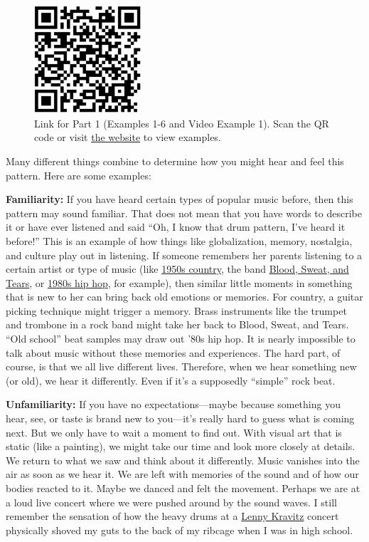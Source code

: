 \documentclass[twoside]{article}
\providecommand{\wmturlcaption}{
  Scan the QR code or visit \href{https://worldmusictextbook.org/witulski-2021}{the website} to view examples.
}
\begin{document}
\begin{figure}
  \centering
  \includegraphics[height=4cm]{witulski-rhythm-part-1.png}
  \caption*{Link for Part 1 (Examples 1-6 and Video Example 1). \wmturlcaption}
\end{figure}

Many different things combine to determine how you might hear and feel
this pattern. Here are some examples:

\textbf{Familiarity:} If you have heard certain types of popular music
before, then this pattern may sound familiar. That does not mean that
you have words to describe it or have ever listened and said ``Oh, I
know that drum pattern, I've heard it before!'' This is an example of
how things like globalization, memory, nostalgia, and culture play out
in listening. If someone remembers her parents listening to a certain
artist or type of music (like
\href{https://www.youtube.com/watch?v=bjCoKslQOEs}{1950s country}, the
band \href{https://www.youtube.com/watch?v=P5jNJd7HRVU}{Blood, Sweat,
and Tears}, or \href{https://www.youtube.com/watch?v=nyYqkRv0D5g}{1980s
hip hop}, for example), then similar little moments in something that is
new to her can bring back old emotions or memories. For country, a
guitar picking technique might trigger a memory. Brass instruments like
the trumpet and trombone in a rock band might take her back to Blood,
Sweat, and Tears. ``Old school'' beat samples may draw out '80s hip hop.
It is nearly impossible to talk about music without these memories and
experiences. The hard part, of course, is that we all live different
lives. Therefore, when we hear something new (or old), we hear it
differently. Even if it's a supposedly ``simple'' rock beat.

\textbf{Unfamiliarity:} If you have no expectations---maybe because
something you hear, see, or taste is brand new to you---it's really hard
to guess what is coming next. But we only have to wait a moment to find
out. With visual art that is static (like a painting), we might take our
time and look more closely at details. We return to what we saw and
think about it differently. Music vanishes into the air as soon as we
hear it. We are left with memories of the sound and of how our bodies
reacted to it. Maybe we danced and felt the movement. Perhaps we are at
a loud live concert where we were pushed around by the sound waves. I
still remember the sensation of how the heavy drums at a
\href{https://www.youtube.com/watch?v=8LhCd1W2V0Q}{Lenny Kravitz}
concert physically shoved my guts to the back of my ribcage when I was
in high school.
\end{document}
